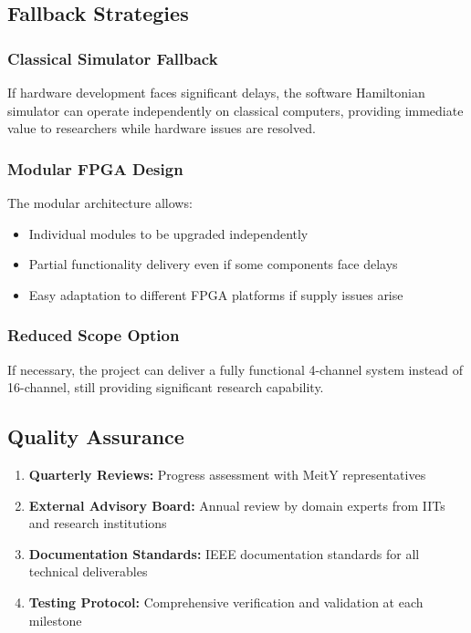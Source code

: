 \documentclass[12pt,a4paper]{article}
\theoremstyle{definition}
\begin{document}
\subsection{Fallback Strategies}

\subsubsection{Classical Simulator Fallback}
If hardware development faces significant delays, the software Hamiltonian simulator can operate independently on classical computers, providing immediate value to researchers while hardware issues are resolved.

\subsubsection{Modular FPGA Design}
The modular architecture allows:
\begin{itemize}
    \item Individual modules to be upgraded independently
    \item Partial functionality delivery even if some components face delays
    \item Easy adaptation to different FPGA platforms if supply issues arise
\end{itemize}

\subsubsection{Reduced Scope Option}
If necessary, the project can deliver a fully functional 4-channel system instead of 16-channel, still providing significant research capability.

\subsection{Quality Assurance}

\begin{enumerate}
    \item \textbf{Quarterly Reviews:} Progress assessment with MeitY representatives
    \item \textbf{External Advisory Board:} Annual review by domain experts from IITs and research institutions
    \item \textbf{Documentation Standards:} IEEE documentation standards for all technical deliverables
    \item \textbf{Testing Protocol:} Comprehensive verification and validation at each milestone
\end{enumerate}
\end{document}
